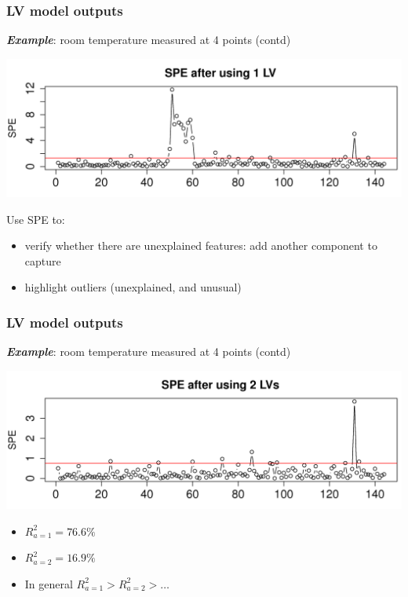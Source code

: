\begin{frame}\frametitle{LV model outputs}

	\textbf{\emph{Example}}: room temperature measured at 4 points (contd)
	
	\begin{center}
		\includegraphics[width=\textwidth]{images/temperatures-SPE-after-one-PC.png}
	\end{center}

	Use SPE to:
	\begin{itemize}
		\item	verify whether there are unexplained features: add another component to capture
		
		\item	highlight outliers (unexplained, and unusual)
	\end{itemize}
	
\end{frame}

\begin{frame}\frametitle{LV model outputs}

	\textbf{\emph{Example}}: room temperature measured at 4 points (contd)
	
	\begin{center}
		\includegraphics[width=\textwidth]{images/temperatures-SPE-after-two-LV.png}
	\end{center}

	\begin{itemize}
		\item	\( R^2_{a=1} = 76.6\% \)
		
		\item	\( R^2_{a=2} = 16.9\% \)
		
		\item	In general \( R^2_{a=1} > R^2_{a=2} > \ldots \)
	\end{itemize}
\end{frame}

